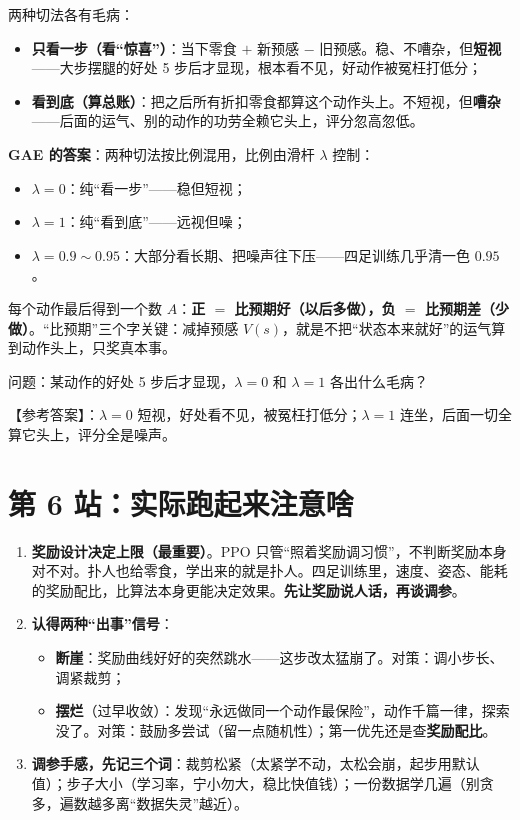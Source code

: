 \documentclass[UTF8,12pt,a4paper]{ctexrep}
\newcommand{\selfcheck}[1]{\begin{checkb}#1\end{checkb}}
\begin{document}
两种切法各有毛病：

\begin{itemize}[nosep]
  \item \textbf{只看一步（看``惊喜''）}：当下零食 $+$ 新预感 $-$ 旧预感。稳、不嘈杂，但\textbf{短视}——大步摆腿的好处 5 步后才显现，根本看不见，好动作被冤枉打低分；
  \item \textbf{看到底（算总账）}：把之后所有折扣零食都算这个动作头上。不短视，但\textbf{嘈杂}——后面的运气、别的动作的功劳全赖它头上，评分忽高忽低。
\end{itemize}

\textbf{GAE 的答案}：两种切法按比例混用，比例由滑杆 $\lambda$ 控制：

\begin{itemize}[nosep]
  \item $\lambda = 0$：纯``看一步''——稳但短视；
  \item $\lambda = 1$：纯``看到底''——远视但噪；
  \item $\lambda = 0.9\sim0.95$：大部分看长期、把噪声往下压——四足训练几乎清一色 $0.95$。
\end{itemize}

每个动作最后得到一个数 $A$：\textbf{正 $=$ 比预期好（以后多做），负 $=$ 比预期差（少做）}。``比预期''三个字关键：减掉预感 $V(s)$，就是不把``状态本来就好''的运气算到动作头上，只奖真本事。

\selfcheck{问题：某动作的好处 5 步后才显现，$\lambda=0$ 和 $\lambda=1$ 各出什么毛病？

【参考答案】：$\lambda=0$ 短视，好处看不见，被冤枉打低分；$\lambda=1$ 连坐，后面一切全算它头上，评分全是噪声。}

\section{第 6 站：实际跑起来注意啥}

\begin{enumerate}[nosep]
  \item \textbf{奖励设计决定上限（最重要）}。PPO 只管``照着奖励调习惯''，不判断奖励本身对不对。扑人也给零食，学出来的就是扑人。四足训练里，速度、姿态、能耗的奖励配比，比算法本身更能决定效果。\textbf{先让奖励说人话，再谈调参}。
  \item \textbf{认得两种``出事''信号}：
  \begin{itemize}[nosep]
    \item \textbf{断崖}：奖励曲线好好的突然跳水——这步改太猛崩了。对策：调小步长、调紧裁剪；
    \item \textbf{摆烂}（过早收敛）：发现``永远做同一个动作最保险''，动作千篇一律，探索没了。对策：鼓励多尝试（留一点随机性）；第一优先还是查\textbf{奖励配比}。
  \end{itemize}
  \item \textbf{调参手感，先记三个词}：裁剪松紧（太紧学不动，太松会崩，起步用默认值）；步子大小（学习率，宁小勿大，稳比快值钱）；一份数据学几遍（别贪多，遍数越多离``数据失灵''越近）。
\end{enumerate}
\end{document}
